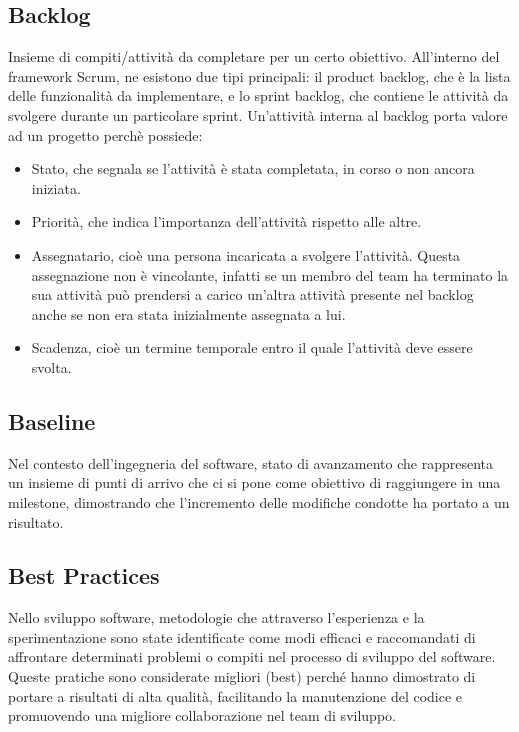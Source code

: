 \subsection*{Backlog}
Insieme di compiti/attività da completare per un certo obiettivo. All’interno del framework Scrum, ne esistono due tipi principali: il product backlog, 
che è la lista delle funzionalità da implementare, e lo sprint backlog, che contiene le attività da svolgere durante un particolare sprint.
Un’attività interna al backlog porta valore ad un progetto perchè possiede:
\begin{itemize}
    \item Stato, che segnala se l’attività è stata completata, in corso o non ancora iniziata.
    \item Priorità, che indica l’importanza dell’attività rispetto alle altre.
    \item Assegnatario, cioè una persona incaricata a svolgere l’attività. Questa assegnazione non è vincolante, infatti se un membro del team ha terminato 
    la sua attività può prendersi a carico un’altra attività presente nel backlog anche se non era stata inizialmente assegnata a lui.
    \item Scadenza, cioè un termine temporale entro il quale l’attività deve essere svolta.
\end{itemize}

\hypertarget{sec:baseline}{}
\subsection*{Baseline}
Nel contesto dell'ingegneria del software, stato di avanzamento che rappresenta un insieme di punti di arrivo che ci si pone come obiettivo di raggiungere 
in una milestone, dimostrando che l'incremento delle modifiche condotte ha portato a un risultato.

\subsection*{Best Practices}
Nello sviluppo software, metodologie che attraverso l’esperienza e la sperimentazione sono state identificate come modi efficaci e raccomandati di 
affrontare determinati problemi o compiti nel processo di sviluppo del software. Queste pratiche sono considerate migliori (best) perché hanno dimostrato 
di portare a risultati di alta qualità, facilitando la manutenzione del codice e promuovendo una migliore collaborazione nel team di sviluppo.

